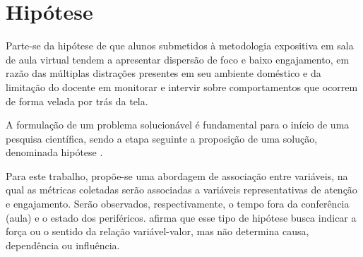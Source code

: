 \section{Hipótese}
Parte-se da hipótese de que alunos submetidos à metodologia expositiva em sala de aula virtual tendem a apresentar dispersão de foco e baixo engajamento, em razão das múltiplas distrações presentes em seu ambiente doméstico e da limitação do docente em monitorar e intervir sobre comportamentos que ocorrem de forma velada por trás da tela.

A formulação de um problema solucionável é fundamental para o início de uma pesquisa científica, sendo a etapa seguinte a proposição de uma solução, denominada hipótese \cite{gilComoElaborarProjetos2008a}.

Para este trabalho, propõe-se uma abordagem de associação entre variáveis, na qual as métricas coletadas serão associadas a variáveis representativas de atenção e engajamento. Serão observados, respectivamente, o tempo fora da conferência (aula) e o estado dos periféricos. \cite{gilComoElaborarProjetos2008a} afirma que esse tipo de hipótese busca indicar a força ou o sentido da relação variável-valor, mas não determina causa, dependência ou influência.